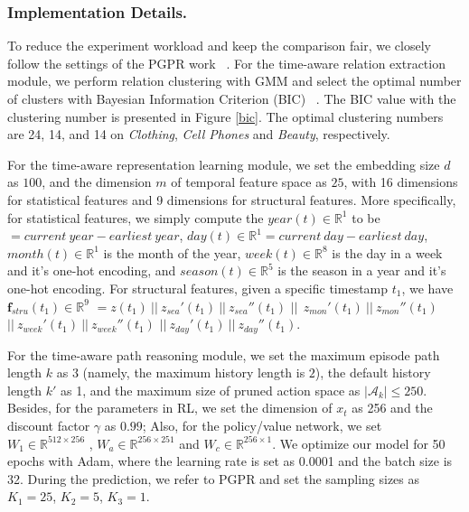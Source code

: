 \subsubsection{Implementation Details.}\label{parasetting}
%

To reduce the experiment workload and keep the comparison fair, we closely follow the settings of the PGPR work ~\cite{pgpr}.
For the time-aware relation extraction module, we perform relation clustering with GMM and select the optimal number of clusters with Bayesian Information Criterion (BIC) ~\cite{bic}. The BIC value with the clustering number is presented in Figure \ref{bic}. The optimal clustering numbers are 24, 14, and 14 on \textit{Clothing}, \textit{Cell Phones} and \textit{Beauty}, respectively.

For the time-aware representation learning module, we set the embedding size $d$ as $100$, and the dimension $m$ of temporal feature space as $25$, with 16 dimensions for statistical features and 9 dimensions for structural features. More specifically, for statistical features, we 
simply compute the $year(t) \in \mathbb{R}^1$ to be $= current\ year - earliest\ year$, $day(t) \in \mathbb{R}^1 = current\ day - earliest\ day$, $month(t) \in \mathbb{R}^1$ is the month of the year, $week(t) \in \mathbb{R}^8$ is the day in a week and it's one-hot encoding, and $season(t) \in \mathbb{R}^5$ is the season in a year and it's one-hot encoding. For structural features, given a specific timestamp $t_1$, we have $\boldsymbol{f}_{stru}(t_1) \in \mathbb{R}^9$ $= z(t_1)\ ||\ z_{sea}'(t_1)\ ||\ z_{sea}''(t_1)$ $||\ 
\ z_{mon}'(t_1)\ ||\ z_{mon}''(t_1)$ $||\ z_{week}'(t_1)\ ||\ z_{week}''(t_1)
$ $||\ z_{day}'(t_1)\ ||\ z_{day}''(t_1)$.



For the time-aware path reasoning module, we set the maximum episode path length $k$ as $3$ (namely,
the maximum history length is $2$), the default history length $k'$ as 1, and the maximum size of pruned action space as $|\mathcal{A}_k|\leq250$.
Besides, for the parameters in RL, we set the dimension of $x_t$ as 256 and the discount factor $\gamma$ as $0.99$; Also, for the policy/value network, we set $W_1 \in \mathbb{R}^{512 \times
256}$ , $W_a \in \mathbb{R}^{256 \times 251}$ and $W_c \in \mathbb{R}^{256 \times 1}$. We optimize our model for 50 epochs with Adam, where the learning rate is set as 0.0001 and the batch size is 32. During the prediction, we refer to PGPR \cite{pgpr} and set the sampling sizes as $K_1=25$, $K_2=5$, $K_3=1$.

